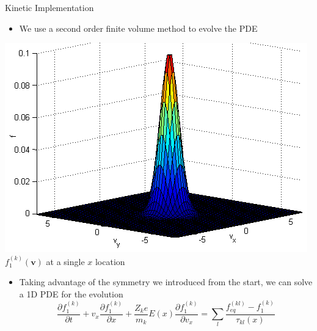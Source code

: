 \documentclass{beamer}
\begin{document}
	\begin{frame}{Kinetic Implementation}
		\begin{itemize}
			\item  We use a second order finite volume method to evolve the PDE\end{itemize}\begin{center}
			\includegraphics[height=0.3\textheight]{example_f.png}
			\\\tiny $f_1^{(k)}(\boldsymbol{v})$ at a single $x$ location
		\end{center}
			\begin{itemize}\item  Taking advantage of the symmetry we introduced from the start, we can solve a 1D PDE for the evolution
			\[\frac{\partial f_1^{(k)}}{\partial t}+v_x\frac{\partial f_1^{(k)}}{\partial x}+\frac{Z_k e}{m_k}E(x)\frac{\partial f_1^{(k)}}{\partial v_x}=\sum_l\frac{f_{eq}^{(kl)}-f_1^{(k)}}{\tau_{kl}(x)}
			\]

		\end{itemize}
	\let\thefootnote\relax{}
	\end{frame}
	
	
	
\end{document}

